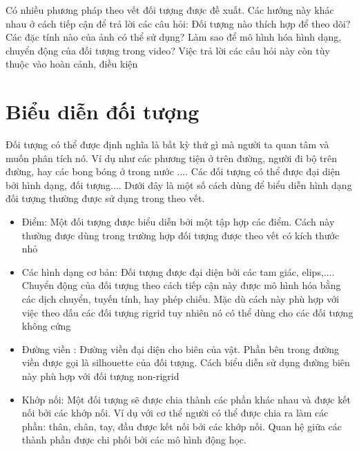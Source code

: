 \documentclass[12pt,oneside,a4]{report}
\begin{document}
Có nhiều phương pháp theo vết đối tượng được đề xuất. Các hướng này khác nhau ở cách tiếp cận để trả lời các câu hỏi: Đối tượng nào thích hợp để theo dõi? Các đặc tính nào của ảnh có thể sử dụng? Làm sao để mô hình hóa hình dạng, chuyển động của đối tượng trong video? Việc trả lời các câu hỏi này còn tùy thuộc vào hoàn cảnh, điều kiện 
\section{Biểu diễn đối tượng }
Đối tượng có thể được định nghĩa là bất kỳ thứ gì mà người ta quan tâm và muốn phân tích nó. Ví dụ như các phương tiện ở trên đường, người đi bộ trên đường, hay các bong bóng ở trong nước .... Các đối tượng có thể được đại diện bởi hình dạng, đối tượng.... Dưới đây là một số cách dùng để biểu diễn hình dạng đối tượng thường được sử dụng trong  theo vết. 
\begin{itemize}
\item Điểm: Một đối tượng được biểu diễn bởi một tập hợp các điểm. Cách này thường được dùng trong trường hợp đối tượng được theo vết có kích thước nhỏ
\item Các hình dạng cơ bản: Đối tượng được đại diện bởi các tam giác, elips,.... Chuyển động của đối tượng theo cách tiếp cận này được mô hình hóa bằng các dịch chuyển, tuyến tính, hay phép chiếu. Mặc dù cách này phù hợp với việc theo dấu các đối tượng rigrid tuy nhiên nó có thể dùng cho các đối tượng không cứng
\item Đường viền : Đường viền đại diện cho biên của vật. Phần bên trong đường viền được gọi là silhouette của đối tượng. Cách biểu diễn sử dụng đường biên này phù hợp với đối tượng non-rigrid
\item Khớp nối: Một đối tượng sẽ được chia thành các phần khác nhau và được kết nối bởi các khớp nối. Ví dụ với cơ thể người có thể được chia ra làm các phần: thân, chân, tay,  đầu được kết nối bởi các khớp nối. Quan hệ giữa các thành phần được chi phối bởi các mô hình động học.
\end{itemize}
\end{document}
